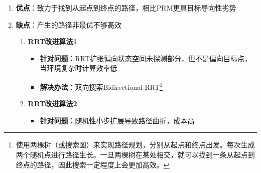 \documentclass[../main.tex]{subfiles}
\begin{document}
\begin{enumerate}
\begin{itemize}
{{\begin{enumerate}
                    \item 在可行空间随机采样
                    \item 找到当前树中离采样点最近的树节点
                    \item 从最近的树节点“生长”出新的节点和树枝(路径)
                    \item 如果此路径没有和环境发生碰撞，则将此节点和路径加到树中
                    \item 重复n次采样，直到树生长到终点区域
                \end{enumerate}
                }}
            \item \textbf{影响规划收敛速度的三个步骤}
                \begin{itemize}
                    \item sample:随机状态的采样
                    \item near:在搜索树中查找与随机状态距离最近的节点
                    \item collision:新生成节点的防碰检测
                \end{itemize}
        \end{itemize}
            \item \textbf{优点}：致力于找到从起点到终点的路径，相比PRM更具目标导向性劣势\\
            \item \textbf{缺点}：产生的路径非最优不够高效
        \begin{enumerate}
            \item \textbf{RRT改进算法1}\label{item:prob:rrt:improv1}
                \begin{itemize}
                    \item \textbf{针对问题}：RRT扩张偏向状态空间未探测部分，但不是偏向目标点，当环境复杂时计算效率低
                    \item \textbf{解决办法}：双向搜索Bidirectional-RRT\footnote{使用两棵树（或搜索图）来实现路径规划，分别从起点和终点出发。每次生成两个随机点进行路径生长。一旦两棵树在某处相交，就可以找到一条从起点到终点的路径，因此搜索一定程度上会更加高效。}
                \end{itemize}
            \item \textbf{RRT改进算法2}\label{item:prob:rrt:improv2}
                \begin{itemize}
                    \item \textbf{针对问题}：随机性小步扩展导致路径曲折，成本高


\end{itemize}
\end{enumerate}
\end{enumerate}
\end{document}
